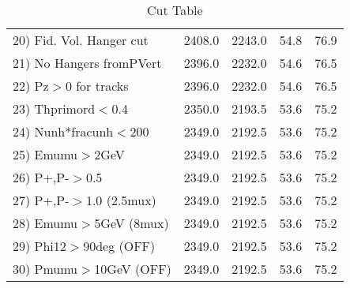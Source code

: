\begin{table}[h!]
\begin{tabular}{||l||r|r|r|r||}
 20) Fid. Vol. Hanger cut &      2408.0 &      2243.0 &        54.8 &        76.9 \\
 21) No Hangers fromPVert &      2396.0 &      2232.0 &        54.6 &        76.5 \\
 22) Pz$>$0 for tracks    &      2396.0 &      2232.0 &        54.6 &        76.5 \\
 23) Thprimord$<$0.4      &      2350.0 &      2193.5 &        53.6 &        75.2 \\
 24) Nunh*fracunh$<$200   &      2349.0 &      2192.5 &        53.6 &        75.2 \\
 25) Emumu$>$2GeV         &      2349.0 &      2192.5 &        53.6 &        75.2 \\
 26) P+,P-$>$0.5          &      2349.0 &      2192.5 &        53.6 &        75.2 \\
 27) P+,P-$>$1.0 (2.5mux) &      2349.0 &      2192.5 &        53.6 &        75.2 \\
 28) Emumu$>$5GeV  (8mux) &      2349.0 &      2192.5 &        53.6 &        75.2 \\
 29) Phi12$>$90deg  (OFF) &      2349.0 &      2192.5 &        53.6 &        75.2 \\
 30) Pmumu$>$10GeV  (OFF) &      2349.0 &      2192.5 &        53.6 &        75.2 \\
 \hline
 \hline
 \end{tabular}
 \caption{Cut Table \cohpip }
 \label{tab-cut_copip}
 \end{table}
